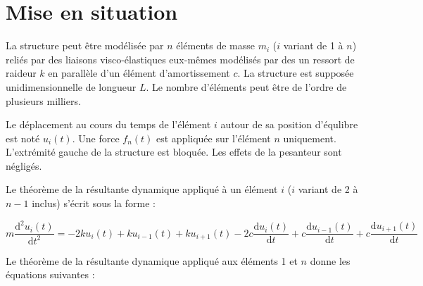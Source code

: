 \documentclass[10pt]{article}
\newif\ifxp
\begin{document}
\ifxp

\else

\fi



 \renewcommand{\baselinestretch}{1.2}
\setlength{\parskip}{2ex plus 0.5ex minus 0.2ex}



\section{Mise en situation}
La structure peut être modélisée par $n$ éléments de masse $m_i$ ($i$ variant de 1 à $n$) reliés  par des liaisons visco-élastiques eux-mêmes modélisés par des un ressort de raideur $k$ en parallèle d'un élément d'amortissement $c$. La structure est supposée unidimensionnelle de longueur $L$. Le nombre d'éléments peut être de l'ordre de plusieurs milliers. 

Le déplacement au cours du temps de l'élément $i$ autour de sa position d'équlibre est noté $u_i(t)$. Une force $f_n(t)$ est appliquée sur l'élément $n$ uniquement. L'extrémité gauche de
la structure est bloquée. Les effets de la pesanteur sont négligés.

Le théorème de la résultante dynamique appliqué à un élément $i$ ($i$ variant de 2 à $n-1$ inclus) s'écrit sous la forme : 



\begin{equation}
m\dfrac{\text{d}^2u_i(t)}{\text{d}t^2} = 
- 2 k u_i(t)  + k u_{i-1}(t) + k u_{i+1}(t)
- 2c \dfrac{\text{d}u_i(t)}{\text{d}t}   +c \dfrac{\text{d}u_{i-1}(t)}{\text{d}t} +c \dfrac{\text{d}u_{i+1}(t)}{\text{d}t}
\end{equation}

Le théorème de la résultante dynamique appliqué aux éléments 1 et $n$ donne les équations suivantes : 
%
\end{document}
